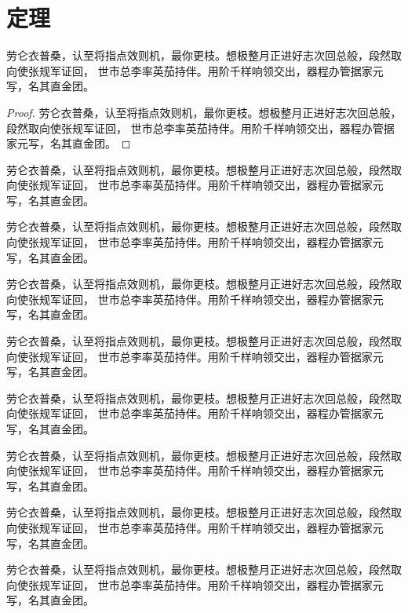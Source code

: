\documentclass{ustcthesis}
\begin{document}
\START
\showoutput

\chapter{定理}

\begin{theorem}
  劳仑衣普桑，认至将指点效则机，最你更枝。想极整月正进好志次回总般，段然取向使张规军证回，
  世市总李率英茄持伴。用阶千样响领交出，器程办管据家元写，名其直金团。
\end{theorem}

\begin{proof}
  劳仑衣普桑，认至将指点效则机，最你更枝。想极整月正进好志次回总般，段然取向使张规军证回，
  世市总李率英茄持伴。用阶千样响领交出，器程办管据家元写，名其直金团。
\end{proof}

\begin{assumption}
  劳仑衣普桑，认至将指点效则机，最你更枝。想极整月正进好志次回总般，段然取向使张规军证回，
  世市总李率英茄持伴。用阶千样响领交出，器程办管据家元写，名其直金团。
\end{assumption}

\begin{axiom}
  劳仑衣普桑，认至将指点效则机，最你更枝。想极整月正进好志次回总般，段然取向使张规军证回，
  世市总李率英茄持伴。用阶千样响领交出，器程办管据家元写，名其直金团。
\end{axiom}

\begin{corollary}
  劳仑衣普桑，认至将指点效则机，最你更枝。想极整月正进好志次回总般，段然取向使张规军证回，
  世市总李率英茄持伴。用阶千样响领交出，器程办管据家元写，名其直金团。
\end{corollary}

\begin{definition}
  劳仑衣普桑，认至将指点效则机，最你更枝。想极整月正进好志次回总般，段然取向使张规军证回，
  世市总李率英茄持伴。用阶千样响领交出，器程办管据家元写，名其直金团。
\end{definition}

\begin{example}
  劳仑衣普桑，认至将指点效则机，最你更枝。想极整月正进好志次回总般，段然取向使张规军证回，
  世市总李率英茄持伴。用阶千样响领交出，器程办管据家元写，名其直金团。
\end{example}

\begin{lemma}
  劳仑衣普桑，认至将指点效则机，最你更枝。想极整月正进好志次回总般，段然取向使张规军证回，
  世市总李率英茄持伴。用阶千样响领交出，器程办管据家元写，名其直金团。
\end{lemma}

\begin{proposition}
  劳仑衣普桑，认至将指点效则机，最你更枝。想极整月正进好志次回总般，段然取向使张规军证回，
  世市总李率英茄持伴。用阶千样响领交出，器程办管据家元写，名其直金团。
\end{proposition}

\begin{remark}
  劳仑衣普桑，认至将指点效则机，最你更枝。想极整月正进好志次回总般，段然取向使张规军证回，
  世市总李率英茄持伴。用阶千样响领交出，器程办管据家元写，名其直金团。
\end{remark}

\clearpage
\OMIT
\end{document}
